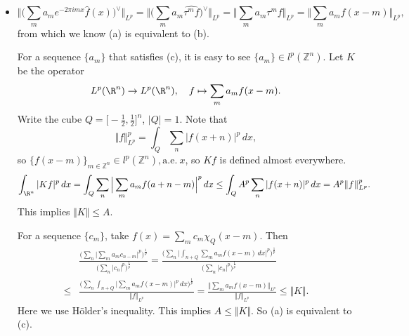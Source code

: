 \begin{itemize}
\item[2.5.9]
$$\bigg\Vert \Big(\sum\limits_m a_me^{-2\pi imx}\hat{f}(x)\Big)^\vee\bigg\Vert_{L^p}
=\bigg\Vert \Big(\sum\limits_m a_m\widehat{\tau^mf}\Big)^\vee\bigg\Vert_{L^p}
=\bigg\Vert \sum\limits_m a_m\tau^mf\bigg\Vert_{L^p}
=\bigg\Vert \sum\limits_m a_mf(x-m)\bigg\Vert_{L^p},$$
from which we know (a) is equivalent to (b).

For a sequence $\{a_m\} $ that satisfies (c), 
it is easy to see $\{a_m\}\in l^p(\mathbb{Z}^n)$.
Let $K$ be the operator
$$L^p(\R^n)\rightarrow L^p(\R^n),\quad f\mapsto\sum\limits_ma_mf(x-m).$$ 
Write the cube $Q=\big[\!-\!\frac12,\frac12\big]^n$, $|Q|=1$.
Note that $$\Vert f\Vert_{L^p}^p=\int_Q\sum\limits_n\vert f(x+n)\vert^p\,dx,$$ 
so $\{ f(x-m)\}_{m\in \mathbb{Z}^n}\in l^p(\mathbb{Z}^n),\mathrm{a.e.}\ x $, 
so $Kf$ is defined almost everywhere.
$$\int_{\R^n} \vert Kf\vert^p\,dx=\int_Q\sum\limits_n\Big\vert \sum_m a_mf(a+n-m)\Big\vert^p\,dx
\leq \int_QA^p\sum\limits_n\vert f(x+n)\vert^p\,dx=A^p\Vert f\Vert^p_{L^p}.$$
This implies $\Vert K\Vert\leq A.$

For a sequence $\{c_m\}$, take $f(x)=\sum\limits_mc_m\chi_Q(x-m)$. Then 
\begin{align*}
    &\frac{\Big(\sum\limits_n\Big\vert\sum\limits_ma_mc_{n-m}\Big\vert^p\Big)^{\frac1p}}{\Big(\sum\limits_n\vert c_n\vert^p\Big)^{\frac1p}}
    =\frac{\Big(\sum\limits_n\Big\vert\int_{n+Q}\sum\limits_m a_mf(x-m)\,dx\Big\vert^p\Big)^{\frac1p}}{\Big(\sum\limits_n\vert c_n\vert^p\Big)^{\frac1p}}\\
    \leq&\frac{\Big(\sum\limits_n\int_{n+Q}\Big\vert\sum\limits_m a_mf(x-m)\Big\vert^p\,dx\Big)^{\frac1p}}{\Vert f\Vert_{L^p}}
    =\frac{\Big\Vert\sum\limits_m a_mf(x-m)\Big\Vert_{L^p}}{\Vert f\Vert_{L^p}}\leq \Vert K\Vert.
\end{align*}
Here we use Hölder's inequality. This implies $A\leq \Vert K\Vert$. So (a) is equivalent to (c).


\end{itemize}
